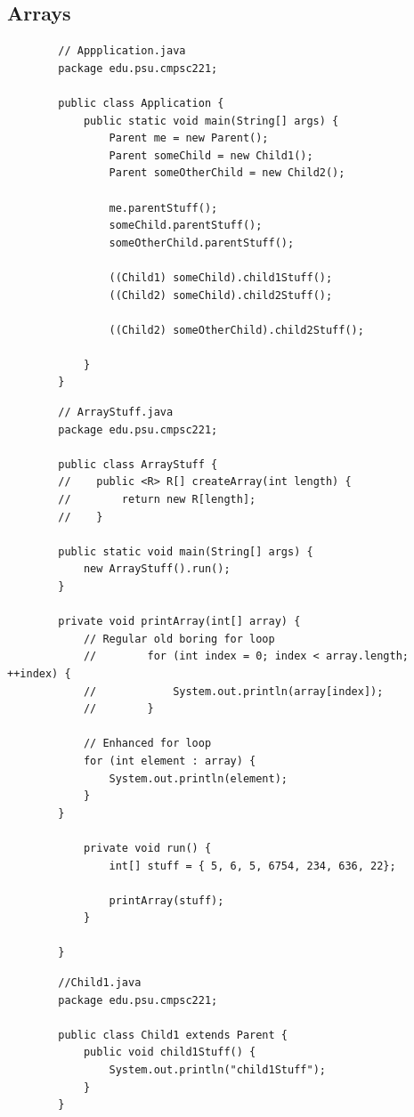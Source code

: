 \documentclass[a4paper, 11pt]{article}
\begin{document}
    \newpage

    \subsection{Arrays}
        \begin{lstlisting}
        // Appplication.java
        package edu.psu.cmpsc221;

        public class Application {
            public static void main(String[] args) {
                Parent me = new Parent();
                Parent someChild = new Child1();
                Parent someOtherChild = new Child2();

                me.parentStuff();
                someChild.parentStuff();
                someOtherChild.parentStuff();

                ((Child1) someChild).child1Stuff();
                ((Child2) someChild).child2Stuff();

                ((Child2) someOtherChild).child2Stuff();

            }
        }
        \end{lstlisting}

        \begin{lstlisting}
        // ArrayStuff.java
        package edu.psu.cmpsc221;

        public class ArrayStuff {
        //    public <R> R[] createArray(int length) {
        //        return new R[length];
        //    }

        public static void main(String[] args) {
            new ArrayStuff().run();
        }

        private void printArray(int[] array) {
            // Regular old boring for loop
            //        for (int index = 0; index < array.length; ++index) {
            //            System.out.println(array[index]);
            //        }

            // Enhanced for loop
            for (int element : array) {
                System.out.println(element);
            }
        }

            private void run() {
                int[] stuff = { 5, 6, 5, 6754, 234, 636, 22};

                printArray(stuff);
            }

        }
        \end{lstlisting}

        \begin{lstlisting}
        //Child1.java
        package edu.psu.cmpsc221;

        public class Child1 extends Parent {
            public void child1Stuff() {
                System.out.println("child1Stuff");
            }
        }
        \end{lstlisting}
\end{document}
